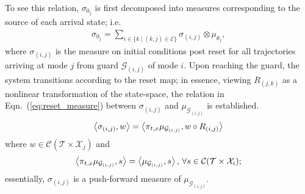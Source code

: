 \par
To see this relation, $\sigma_{0_j}$ is first decomposed into measures corresponding to the source of each arrival state; i.e.
\begin{align}
  \sigma_{0_j}=\sum_{i\in \{k\mid (k,j)\in \mathcal E\}} \sigma_{(i,j)}\otimes \mu_{\theta_j},
\end{align}
where $\sigma_{(i,j)}$ is the measure on initial conditions post reset for all trajectories arriving at mode $j$ from guard $\mathcal G_{(i,j)}$ of mode $i$. Upon reaching the guard, the system transitions according to the reset map; in essence, viewing $R_{(j,k)}$ as a nonlinear transformation of the state-space, the relation in Eqn.~(\ref{eq:reset_measure}) between $\sigma_{(i,j)}$ and $\mu_{\mathcal G_{(i,j)}}$ is established.
\begin{align}
    \left\langle \sigma_{(i,j)},w\right\rangle=\left\langle \pi_{t,x}\mu_{\mathcal G_{(i,j)}},w\circ R_{(i,j)}\right\rangle
    \label{eq:reset_measure}
\end{align}
where $w\in \mathcal C(\mathcal T\times \mathcal X_j)$ and
$$
  \left\langle \pi_{t,x}\mu_{\mathcal G_{(i,j)}},s\right\rangle=\left\langle \mu_{\mathcal G_{(i,j)}},s\right\rangle,\,\forall s\in \mathcal C(\mathcal T\times \mathcal X_i);
$$
essentially, $\sigma_{(i,j)}$ is a push-forward measure of $\mu_{\mathcal G_{(i,j)}}$.
